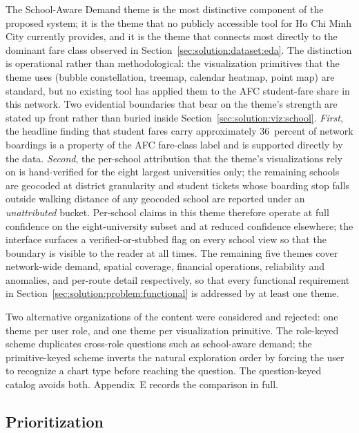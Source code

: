 The School-Aware Demand theme is the most distinctive component of the
proposed system; it is the theme that no publicly accessible tool for
Ho Chi Minh City currently provides, and it is the theme that connects most
directly to the dominant fare class observed in
Section~\ref{sec:solution:dataset:eda}. The distinction is operational
rather than methodological: the visualization primitives that the theme
uses (bubble constellation, treemap, calendar heatmap, point map) are
standard, but no existing tool has applied them to the AFC student-fare
share in this network. Two evidential boundaries that bear on the
theme's strength are stated up front rather than buried inside
Section~\ref{sec:solution:viz:school}. \textit{First}, the headline
finding that student fares carry approximately 36~percent of network
boardings is a property of the AFC fare-class label and is supported
directly by the data. \textit{Second}, the per-school attribution that
the theme's visualizations rely on is hand-verified for the eight largest
universities only; the remaining schools are geocoded at district
granularity and student tickets whose boarding stop falls outside
walking distance of any geocoded school are reported under an
\textit{unattributed} bucket. Per-school claims in this theme therefore
operate at full confidence on the eight-university subset and at reduced
confidence elsewhere; the interface surfaces a verified-or-stubbed flag
on every school view so that the boundary is visible to the reader at
all times. The remaining five themes cover network-wide demand, spatial
coverage, financial operations, reliability and anomalies, and per-route
detail respectively, so that every functional requirement in
Section~\ref{sec:solution:problem:functional} is addressed by at least
one theme.

Two alternative organizations of the content were considered and
rejected: one theme per user role, and one theme per visualization
primitive. The role-keyed scheme duplicates cross-role questions such
as school-aware demand; the primitive-keyed scheme inverts the natural
exploration order by forcing the user to recognize a chart type before
reaching the question. The question-keyed catalog avoids both.
Appendix~E records the comparison in full.

\subsection{Prioritization}
\label{sec:solution:themes:prioritization}

